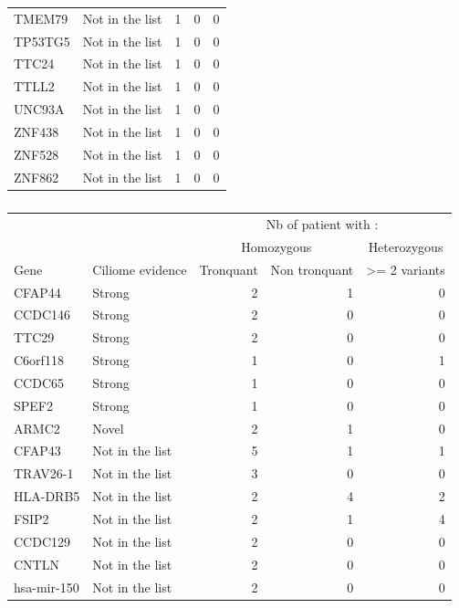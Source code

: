 \documentclass[12pt,twoside]{reedthesis}
\theoremstyle{definition}
\theoremstyle{definition}
\theoremstyle{remark}
\begin{document}
\begin{longtable}[t]{llrrr}
  TMEM79 & Not in the list & 1 & 0 & 0\\
  TP53TG5 & Not in the list & 1 & 0 & 0\\
  TTC24 & Not in the list & 1 & 0 & 0\\
  TTLL2 & Not in the list & 1 & 0 & 0\\
  \addlinespace
  UNC93A & Not in the list & 1 & 0 & 0\\
  ZNF438 & Not in the list & 1 & 0 & 0\\
  ZNF528 & Not in the list & 1 & 0 & 0\\
  ZNF862 & Not in the list & 1 & 0 & 0\\
  \bottomrule
  \end{longtable}
  
  \newpage
  
  \begin{longtable}[t]{llrrr}
  \caption{\label{tab:annexetabafterdnah1}}\\
  \toprule
  \multicolumn{1}{c}{ } & \multicolumn{1}{c}{ } & \multicolumn{3}{c}{Nb of patient with : } \\
  \cmidrule(l{2pt}r{2pt}){3-5}
  \multicolumn{1}{c}{ } & \multicolumn{1}{c}{ } & \multicolumn{2}{c}{Homozygous} & \multicolumn{1}{c}{Heterozygous} \\
  \cmidrule(l{2pt}r{2pt}){3-4} \cmidrule(l{2pt}r{2pt}){5-5}
  Gene & Ciliome evidence & Tronquant & Non tronquant & >= 2 variants\\
  \midrule
  CFAP44 & Strong & 2 & 1 & 0\\
  CCDC146 & Strong & 2 & 0 & 0\\
  TTC29 & Strong & 2 & 0 & 0\\
  C6orf118 & Strong & 1 & 0 & 1\\
  CCDC65 & Strong & 1 & 0 & 0\\
  \addlinespace
  SPEF2 & Strong & 1 & 0 & 0\\
  ARMC2 & Novel & 2 & 1 & 0\\
  CFAP43 & Not in the list & 5 & 1 & 1\\
  TRAV26-1 & Not in the list & 3 & 0 & 0\\
  HLA-DRB5 & Not in the list & 2 & 4 & 2\\
  \addlinespace
  FSIP2 & Not in the list & 2 & 1 & 4\\
  CCDC129 & Not in the list & 2 & 0 & 0\\
  CNTLN & Not in the list & 2 & 0 & 0\\
  hsa-mir-150 & Not in the list & 2 & 0 & 0\\

\end{longtable}
\end{document}
